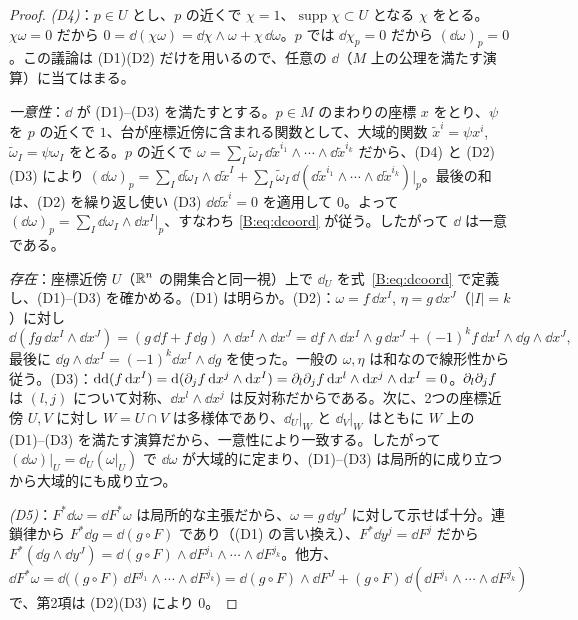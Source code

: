 \begin{proof}
\emph{(D4)}：$p\in U$ とし、$p$ の近くで $\chi=1$、$\operatorname{supp}\chi\subset U$ となる $\chi$ をとる。$\chi\omega=0$ だから $0=\dd(\chi\omega)=\dd\chi\wedge\omega+\chi\,\dd\omega$。$p$ では $\dd\chi_p=0$ だから $(\dd\omega)_p=0$。この議論は (D1)(D2) だけを用いるので、任意の $\dd$（$M$ 上の公理を満たす演算）に当てはまる。

\emph{一意性}：$\dd$ が (D1)--(D3) を満たすとする。$p\in M$ のまわりの座標 $x$ をとり、$\psi$ を $p$ の近くで $1$、台が座標近傍に含まれる関数として、大域的関数 $\tilde x^i=\psi x^i$, $\tilde\omega_I=\psi\omega_I$ をとる。$p$ の近くで $\omega=\sum_I\tilde\omega_I\,\dd\tilde x^{i_1}\wedge\cdots\wedge\dd\tilde x^{i_k}$ だから、(D4) と (D2)(D3) により
$(\dd\omega)_p=\sum_I\dd\tilde\omega_I\wedge\dd\tilde x^{I}+\sum_I\tilde\omega_I\,\dd(\dd\tilde x^{i_1}\wedge\cdots\wedge\dd\tilde x^{i_k})\big|_p$。最後の和は、(D2) を繰り返し使い (D3) $\dd\dd\tilde x^i=0$ を適用して $0$。よって $(\dd\omega)_p=\sum_I\dd\omega_I\wedge\dd x^I|_p$、すなわち \eqref{B:eq:dcoord} が従う。したがって $\dd$ は一意である。

\emph{存在}：座標近傍 $U$（$\mathbb R^n$ の開集合と同一視）上で $\dd_U$ を式~\eqref{B:eq:dcoord} で定義し、(D1)--(D3) を確かめる。(D1) は明らか。(D2)：$\omega=f\,\dd x^I$, $\eta=g\,\dd x^J$（$|I|=k$）に対し
\[
\dd(fg\,\dd x^I\wedge\dd x^J)=(g\,\dd f+f\,\dd g)\wedge\dd x^I\wedge\dd x^J
=\dd f\wedge\dd x^I\wedge g\,\dd x^J+(-1)^k f\,\dd x^I\wedge\dd g\wedge\dd x^J,
\]
最後に $\dd g\wedge\dd x^I=(-1)^k\dd x^I\wedge\dd g$ を使った。一般の $\omega,\eta$ は和なので線形性から従う。(D3)：$\mathrm{d}\mathrm{d}(f\,\mathrm{d} x^I)=\mathrm{d}(\partial_jf\,\mathrm{d} x^j\wedge\mathrm{d} x^I)=\partial_l\partial_jf\,\mathrm{d} x^l\wedge\mathrm{d} x^j\wedge\mathrm{d} x^I=0$。$\partial_l\partial_jf$ は $(l,j)$ について対称、$\dd x^l\wedge\dd x^j$ は反対称だからである。次に、2つの座標近傍 $U,V$ に対し $W=U\cap V$ は多様体であり、$\dd_U|_W$ と $\dd_V|_W$ はともに $W$ 上の (D1)--(D3) を満たす演算だから、一意性により一致する。したがって $(\dd\omega)|_U=\dd_U(\omega|_U)$ で $\dd\omega$ が大域的に定まり、(D1)--(D3) は局所的に成り立つから大域的にも成り立つ。

\emph{(D5)}：$F^*\dd\omega=\dd F^*\omega$ は局所的な主張だから、$\omega=g\,\dd y^J$ に対して示せば十分。連鎖律から $F^*\dd g=\dd(g\circ F)$ であり（(D1) の言い換え）、$F^*\dd y^j=\dd F^j$ だから
$F^*(\dd g\wedge\dd y^J)=\dd(g\circ F)\wedge\dd F^{j_1}\wedge\cdots\wedge\dd F^{j_k}$。他方、$\dd F^*\omega=\dd\bigl((g\circ F)\,\dd F^{j_1}\wedge\cdots\wedge\dd F^{j_k}\bigr)=\dd(g\circ F)\wedge\dd F^{J}+(g\circ F)\,\dd(\dd F^{j_1}\wedge\cdots\wedge\dd F^{j_k})$ で、第2項は (D2)(D3) により $0$。
\end{proof}

